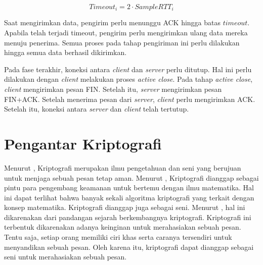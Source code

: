 \begin{equation}
  \label{eq:tcp.timeout}
  Timeout_{i} = 2 \cdot SampleRTT_i
\end{equation}

Saat mengirimkan data, pengirim perlu menunggu ACK hingga batas $timeout$. Apabila telah terjadi timeout, pengirim perlu mengirimkan ulang data mereka menuju penerima. Semua proses pada tahap pengiriman ini perlu dilakukan hingga semua data berhasil dikirimkan.

Pada fase terakhir, koneksi antara \emph{client} dan \emph{server} perlu ditutup. Hal ini perlu dilakukan dengan \emph{client} melakukan proses \emph{active close}. Pada tahap \emph{active close}, \emph{client} mengirimkan pesan FIN. Setelah itu, \emph{server} mengirimkan pesan FIN+ACK. Setelah menerima pesan dari \emph{server}, \emph{client} perlu mengirimkan ACK. Setelah itu, koneksi antara \emph{server} dan \emph{client} telah tertutup.

\section{Pengantar Kriptografi}
Menurut \textcite{schneier1996}, Kriptografi merupakan ilmu pengetahuan dan seni yang berujuan untuk menjaga sebuah pesan tetap aman. Menurut \textcite{anderson2008}, Kriptografi dianggap sebagai pintu para pengembang keamanan untuk bertemu dengan ilmu matematika. Hal ini dapat terlihat bahwa banyak sekali algoritma kriptografi yang terkait dengan konsep matematika. Kriptografi dianggap juga sebagai seni. Menurut \textcite{munir2019}, hal ini dikarenakan dari pandangan sejarah berkembangnya kriptografi. Kriptografi ini terbentuk dikarenakan adanya keinginan untuk merahasiakan sebuah pesan. Tentu saja, setiap orang memiliki ciri khas serta caranya tersendiri untuk menyandikan sebuah pesan. Oleh karena itu, kriptografi dapat dianggap sebagai seni untuk merahasiakan sebuah pesan. 

